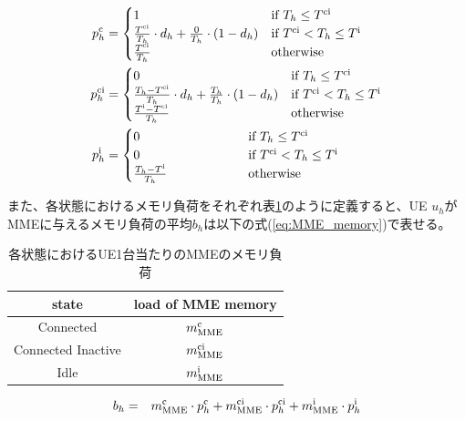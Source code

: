 \documentclass[a4j]{ujarticle}
\begin{document}
\begin{align}
	p^{\rm c}_h & =
	\begin{cases}
    1 \hphantom{100000000000000} & \text{if $T_h \le T^{\rm ci}$}\\
    \frac{T^{\rm ci}}{T_h} \cdot d_h + \frac{0}{T_h} \cdot (1 - d_h)& \text{if $T^{\rm ci} < T_h \le T^{\rm i}$}\\
    \frac{T^{\rm ci}}{T_h} & \text{otherwise}
  \end{cases} \label{eq:connected}\\
	p^{\rm ci}_h & =
  \begin{cases}
    0 \hphantom{100000000000000} & \text{if $T_h \le T^{\rm ci}$}\\
		\frac{T_h - T^{\rm ci}}{T_h} \cdot d_h + \frac{T_h}{T_h} \cdot (1 - d_h) & \text{if $T^{\rm ci} < T_h \le T^{\rm i}$}\\
    \frac{T^{\rm i} - T^{\rm ci}}{T_h} & \text{otherwise}
  \end{cases} \label{eq:inactive}\\
	p^{\rm i}_h & =
  \begin{cases}
    0 \hphantom{100000000000000} & \text{if $T_h \le T^{\rm ci}$}\\
		0 & \text{if $T^{\rm ci} < T_h \le T^{\rm i}$}\\
    \frac{T_h - T^{\rm i}}{T_h} & \text{otherwise}
  \end{cases}\label{eq:idle}
\end{align}

また、各状態におけるメモリ負荷をそれぞれ表\ref{table:state_memory}のように定義すると、UE $u_h$がMMEに与えるメモリ負荷の平均$b_h$は以下の式(\ref{eq:MME_memory})で表せる。

\begin{table}[h]
 \caption{各状態におけるUE1台当たりのMMEのメモリ負荷}
 \label{table:state_memory}
 \centering
  \begin{tabular}{cc}
   \hline
   state & load of MME memory \\
   \hline \hline
   Connected & $m^{\rm c}_{\rm MME}$ \\
   Connected Inactive & $m^{\rm ci}_{\rm MME}$ \\
   Idle & $m^{\rm i}_{\rm MME}$ \\
   \hline
  \end{tabular}
\end{table}

\begin{eqnarray}
  b_h & = & m^{\rm c}_{\rm MME} \cdot p^{\rm c}_h + m^{\rm ci}_{\rm MME} \cdot p^{\rm ci}_h + m^{\rm i}_{\rm MME} \cdot p^{\rm i}_h \label{eq:MME_memory}
\end{eqnarray}
\end{document}
